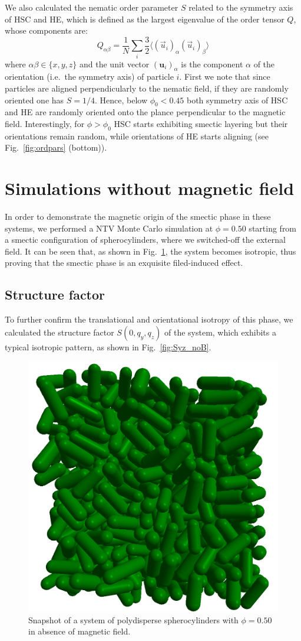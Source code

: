\documentclass[aip,graphicx]{revtex4-1} %
\begin{document}
We also calculated the nematic order parameter $S$ related to the symmetry axis of HSC and HE, which
is defined as the largest eigenvalue of the order tensor $Q$, whose components are:
\begin{equation}
  Q_{\alpha\beta} = \frac{1}{N} \sum_i \frac{3}{2} \langle {(\vec{u}_i)}_\alpha {(\vec{u}_i)}_\beta\rangle
\label{eq:nemop}
\end{equation}
where $\alpha\beta\in\{x,y,z\}$ and the unit vector ${(\mathbf{u}_i)}_\alpha$ is the component $\alpha$ of the orientation (i.e.~the symmetry axis) of particle $i$.
First we note that since particles are aligned perpendicularly to the nematic field, if they are 
randomly oriented one has $S=1/4$. Hence, below $\phi_0 < 0.45$ both symmetry axis of HSC and HE are 
randomly oriented onto the plance perpendicular to the magnetic field.
Interestingly, for $\phi > \phi_0$ HSC starts exhibiting smectic layering but their orientations
remain random, while orientations of HE starts aligning (see Fig.~\ref{fig:ordpars} (bottom)).


\section{Simulations without magnetic field}

In order to demonstrate the magnetic origin of the smectic phase in these systems, we performed a NTV Monte Carlo simulation at $\phi=0.50$ starting from a smectic configuration  
of spherocylinders, where we switched-off the external field. 
It can be seen that, as shown in Fig.~\ref{fig:noB_snapshot}, the system becomes isotropic, thus proving that the smectic phase is an exquisite filed-induced effect.

\subsection{Structure factor}
To further confirm the translational and orientational isotropy of this phase, 
we calculated the structure factor $S(0, q_y, q_z)$ of the system, which exhibits a typical isotropic pattern, as shown in Fig.~\ref{fig:Syz_noB}.


\begin{figure}
    \centering
    \includegraphics[width=0.4\columnwidth]{Isotropic_phase_snap.png}
    \caption{Snapshot of a system of polydisperse spherocylinders with $\phi = 0.50$ in absence of magnetic field.}\label{fig:noB_snapshot}
\end{figure}
\end{document}
